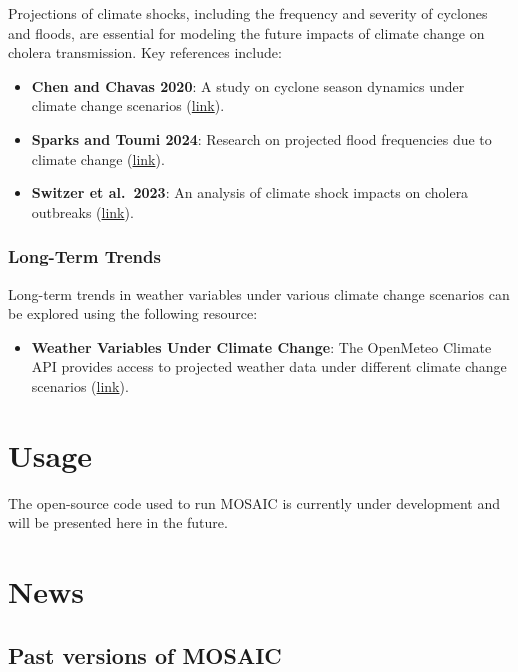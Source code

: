 \documentclass[
]{book}
\providecommand{\tightlist}{%
  \setlength{\itemsep}{0pt}\setlength{\parskip}{0pt}}
\begin{document}
Projections of climate shocks, including the frequency and severity of cyclones and floods, are essential for modeling the future impacts of climate change on cholera transmission. Key references include:

\begin{itemize}
\tightlist
\item
  \textbf{Chen and Chavas 2020}: A study on cyclone season dynamics under climate change scenarios (\href{https://journals.ametsoc.org/view/journals/atsc/77/8/jasD190320.xml}{link}).
\item
  \textbf{Sparks and Toumi 2024}: Research on projected flood frequencies due to climate change (\href{https://www.nature.com/articles/s41597-024-03250-y}{link}).
\item
  \textbf{Switzer et al.~2023}: An analysis of climate shock impacts on cholera outbreaks (\href{https://www.nature.com/articles/s43247-023-00844-z}{link}).
\end{itemize}

\subsection{Long-Term Trends}\label{long-term-trends}

Long-term trends in weather variables under various climate change scenarios can be explored using the following resource:

\begin{itemize}
\tightlist
\item
  \textbf{Weather Variables Under Climate Change}: The OpenMeteo Climate API provides access to projected weather data under different climate change scenarios (\href{https://open-meteo.com/en/docs/climate-api}{link}).
\end{itemize}

\chapter{Usage}\label{usage}

The open-source code used to run MOSAIC is currently under development and will be presented here in the future.

\chapter{News}\label{news}

\section{Past versions of MOSAIC}\label{past-versions-of-mosaic}
\end{document}
